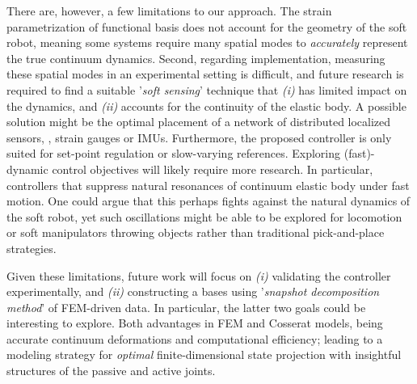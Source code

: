 There are, however, a few limitations to our approach. The strain parametrization of functional basis does not account for the geometry of the soft robot, meaning some systems require many spatial modes to \textit{accurately} represent the true continuum dynamics. Second, regarding implementation, measuring these spatial modes in an experimental setting is difficult, and future research is required to find a suitable '\textit{soft sensing}' technique that  \textit{(i)} has limited impact on the dynamics, and \textit{(ii)} accounts for the continuity of the elastic body. A possible solution might be the optimal placement of a network of distributed localized sensors, \eg, strain gauges or IMUs. Furthermore, the proposed controller is only suited for set-point regulation or slow-varying references. Exploring (fast)-dynamic control objectives will likely require more research. In particular, controllers that suppress natural resonances of continuum elastic body under fast motion. One could argue that this perhaps fights against the natural dynamics of the soft robot, yet such oscillations might be able to be explored for locomotion or soft manipulators throwing objects rather than traditional pick-and-place strategies.

Given these limitations, future work will focus on \textit{(i)} validating the controller experimentally, and \textit{(ii)} constructing a bases using '\emph{snapshot decomposition method}' of FEM-driven data. In particular, the latter two goals could be interesting to explore. 
Both advantages in FEM and Cosserat models, being accurate continuum deformations and computational efficiency; leading to a modeling strategy for \textit{optimal} finite-dimensional state projection with insightful structures of the passive and active joints.
